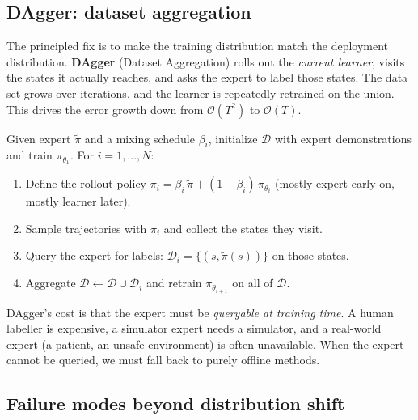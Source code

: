 \documentclass[11pt, oneside]{book}
\newcommand{\dataset}{\mathcal{D}}       %
\newcommand{\bigO}[1]{\mathcal{O}\!\left(#1\right)}
\begin{document}
\subsection{DAgger: dataset aggregation}

The principled fix is to make the training distribution match the deployment
distribution. \textbf{DAgger} (Dataset Aggregation) rolls out the \emph{current learner},
visits the states it actually reaches, and asks the expert to label those states.
The data set grows over iterations, and the learner is repeatedly retrained on the
union. This drives the error growth down from $\bigO{T^2}$ to $\bigO{T}$.

\begin{thmbox}[title={DAgger}]
Given expert $\tilde\pi$ and a mixing schedule $\beta_i$, initialize $\dataset$ with
expert demonstrations and train $\pi_{\theta_1}$. For $i = 1, \dots, N$:
\begin{enumerate}
  \item Define the rollout policy $\pi_i = \beta_i\,\tilde\pi + (1-\beta_i)\,\pi_{\theta_i}$
    (mostly expert early on, mostly learner later).
  \item Sample trajectories with $\pi_i$ and collect the states they visit.
  \item Query the expert for labels: $\dataset_i = \{(s, \tilde\pi(s))\}$ on those states.
  \item Aggregate $\dataset \leftarrow \dataset \cup \dataset_i$ and retrain
    $\pi_{\theta_{i+1}}$ on all of $\dataset$.
\end{enumerate}
\end{thmbox}

DAgger's cost is that the expert must be \emph{queryable at training time}. A human
labeller is expensive, a simulator expert needs a simulator, and a real-world expert
(a patient, an unsafe environment) is often unavailable. When the expert cannot be
queried, we must fall back to purely offline methods.

\subsection{Failure modes beyond distribution shift}
\end{document}
